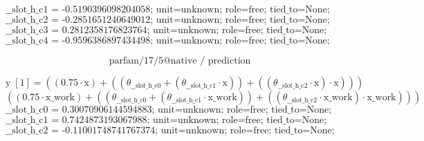 \[\text{\_\_slot\_h\_c1 = -0.5190396098204058; unit=unknown; role=free; tied\_to=None; bounds=[None, None]; origin=native\_coefficient\_block}\]
\[\text{\_\_slot\_h\_c2 = -0.2851651240649012; unit=unknown; role=free; tied\_to=None; bounds=[None, None]; origin=native\_coefficient\_block}\]
\[\text{\_\_slot\_h\_c3 = 0.2812358176823764; unit=unknown; role=free; tied\_to=None; bounds=[None, None]; origin=native\_normalized\_denominator\_coordinate}\]
\[\text{\_\_slot\_h\_c4 = -0.9596386897434498; unit=unknown; role=free; tied\_to=None; bounds=[None, None]; origin=native\_normalized\_denominator\_coordinate}\]
\noindent {}\par
\noindent {}\par
\noindent {}\par
\noindent {}\par
\[\text{parfam/17/5@native / prediction}\]
\noindent {}\par
\[\text{y}\;[\text{1}] = \left(\left(0.75 \cdot \text{x}\right) + \left(\left(\theta_{\text{\_\_slot\_h\_c0}} + \left(\theta_{\text{\_\_slot\_h\_c1}} \cdot \text{x}\right)\right) + \left(\left(\theta_{\text{\_\_slot\_h\_c2}} \cdot \text{x}\right) \cdot \text{x}\right)\right)\right)\]
\[\left(\left(0.75 \cdot \text{x\_work}\right) + \left(\left(\theta_{\text{\_\_slot\_h\_c0}} + \left(\theta_{\text{\_\_slot\_h\_c1}} \cdot \text{x\_work}\right)\right) + \left(\left(\theta_{\text{\_\_slot\_h\_c2}} \cdot \text{x\_work}\right) \cdot \text{x\_work}\right)\right)\right)\]
\[\text{\_\_slot\_h\_c0 = 0.30070906144594883; unit=unknown; role=free; tied\_to=None; bounds=[None, None]; origin=native\_coefficient\_block}\]
\[\text{\_\_slot\_h\_c1 = 0.7424873193067988; unit=unknown; role=free; tied\_to=None; bounds=[None, None]; origin=native\_coefficient\_block}\]
\[\text{\_\_slot\_h\_c2 = -0.11001748741767374; unit=unknown; role=free; tied\_to=None; bounds=[None, None]; origin=native\_coefficient\_block}\]
\noindent {}\par
\noindent {}\par
